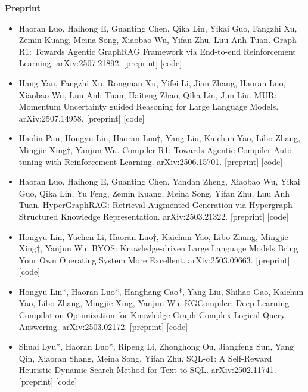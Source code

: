 \documentclass[letterpaper,11pt]{article}
\newcommand{\resumeSubHeadingListStart}{\begin{itemize}[leftmargin=*]}
\newcommand{\resumeSubHeadingListEnd}{\end{itemize}}
\begin{document}
\vspace{1mm}
\textbf{Preprint}
\vspace{-1mm}
\resumeSubHeadingListStart
\item Haoran Luo, Haihong E, Guanting Chen, Qika Lin, Yikai Guo, Fangzhi Xu, Zemin Kuang, Meina Song, Xiaobao Wu, Yifan Zhu, Luu Anh Tuan. Graph-R1: Towards Agentic GraphRAG Framework via End-to-end Reinforcement Learning. arXiv:2507.21892. [preprint] [code]
\item Hang Yan, Fangzhi Xu, Rongman Xu, Yifei Li, Jian Zhang, Haoran Luo, Xiaobao Wu, Luu Anh Tuan, Haiteng Zhao, Qika Lin, Jun Liu. MUR: Momentum Uncertainty guided Reasoning for Large Language Models. arXiv:2507.14958. [preprint] [code]
\item Haolin Pan, Hongyu Lin, Haoran Luo†, Yang Liu, Kaichun Yao, Libo Zhang, Mingjie Xing†, Yanjun Wu. Compiler-R1: Towards Agentic Compiler Auto-tuning with Reinforcement Learning. arXiv:2506.15701. [preprint] [code]
\item Haoran Luo, Haihong E, Guanting Chen, Yandan Zheng, Xiaobao Wu, Yikai Guo, Qika Lin, Yu Feng, Zemin Kuang, Meina Song, Yifan Zhu, Luu Anh Tuan. HyperGraphRAG: Retrieval-Augmented Generation via Hypergraph-Structured Knowledge Representation. arXiv:2503.21322. [preprint] [code]
\item Hongyu Lin, Yuchen Li, Haoran Luo†, Kaichun Yao, Libo Zhang, Mingjie Xing†, Yanjun Wu. BYOS: Knowledge-driven Large Language Models Bring Your Own Operating System More Excellent. arXiv:2503.09663. [preprint] [code]
\item Hongyu Lin*, Haoran Luo*, Hanghang Cao*, Yang Liu, Shihao Gao, Kaichun Yao, Libo Zhang, Mingjie Xing, Yanjun Wu. KGCompiler: Deep Learning Compilation Optimization for Knowledge Graph Complex Logical Query Answering. arXiv:2503.02172. [preprint] [code]
\item Shuai Lyu*, Haoran Luo*, Ripeng Li, Zhonghong Ou, Jiangfeng Sun, Yang Qin, Xiaoran Shang, Meina Song, Yifan Zhu. SQL-o1: A Self-Reward Heuristic Dynamic Search Method for Text-to-SQL. arXiv:2502.11741. [preprint] [code]
\resumeSubHeadingListEnd
\end{document}
